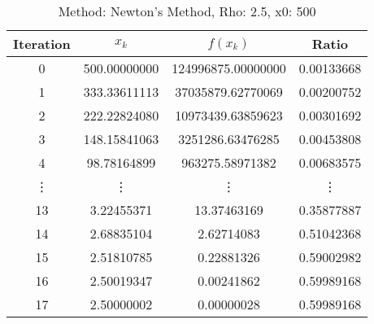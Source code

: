 \begin{table}
\centering
\caption{Method: Newton's Method, Rho: 2.5, x0: 500}
\label{tab:table_Newton's_Method_2_5_500}
\begin{tabular}{c c c c}
\toprule
Iteration &        $x_k$ &           $f(x_k)$ &      Ratio \\
\midrule
        0 & 500.00000000 & 124996875.00000000 & 0.00133668 \\
        1 & 333.33611113 &  37035879.62770069 & 0.00200752 \\
        2 & 222.22824080 &  10973439.63859623 & 0.00301692 \\
        3 & 148.15841063 &   3251286.63476285 & 0.00453808 \\
        4 &  98.78164899 &    963275.58971382 & 0.00683575 \\
   \vdots &       \vdots &             \vdots &     \vdots \\
       13 &   3.22455371 &        13.37463169 & 0.35877887 \\
       14 &   2.68835104 &         2.62714083 & 0.51042368 \\
       15 &   2.51810785 &         0.22881326 & 0.59002982 \\
       16 &   2.50019347 &         0.00241862 & 0.59989168 \\
       17 &   2.50000002 &         0.00000028 & 0.59989168 \\
\bottomrule
\end{tabular}
\end{table}
